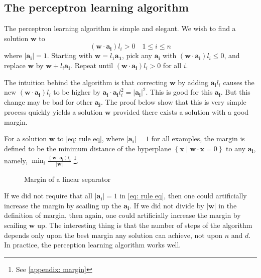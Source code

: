 \subsection{The perceptron learning algorithm}

The perceptron learning algorithm is simple and elegant. We wish to find a solution \(\mathbf{w} \) to 
\begin{equation} \label{eq: rule eq}
    \left( \mathbf{w}  \cdot \mathbf{a_i}  \right) l_i > 0 \quad 1 \leq i \leq n 
\end{equation}
where \(\vert \mathbf{a_i}  \vert = 1 \). Starting with \(\mathbf{w} = l_1 \mathbf{a_1} \), pick any \(\mathbf{a_i} \) with \(\left( \mathbf{w} \cdot \mathbf{a_i} \right) l_i \le 0 \), and replace \(\mathbf{w} \) by \(\mathbf{w} + l_i \mathbf{a_i} \). Repeat until \((\mathbf{w} \cdot \mathbf{a_i} ) l_i > 0\) for all \(i\). 

The intuition behind the algorithm is that correcting \(\mathbf{w} \) by adding \(\mathbf{a_i} l_i\) causes the new \(\left( \mathbf{w} \cdot \mathbf{a_i}  \right) l_i \) to be higher by \(\mathbf{a_i} \cdot \mathbf{a_i} l_i^2 = \vert \mathbf{a_i}  \vert^2  \). This is good for this \(\mathbf{a_i} \). But this change may be bad for other \(\mathbf{a_j} \). The proof below show that this is very simple process quickly yields a solution \(\mathbf{w} \) provided there exists a solution with a good margin. 

\begin{definition}[margin]
    For a solution \(\mathbf{w} \) to \autoref{eq: rule eq}, where \(\vert \mathbf{a_i}  \vert = 1 \) for all examples, the margin is defined to be the minimum distance of the hyperplane \(\left\{ \mathbf{x} \mid \mathbf{w} \cdot \mathbf{x} = 0 \right\} \) to any  \(\mathbf{a_i} \), namely, \(\min _i \frac{(\mathbf{w} \cdot \mathbf{a_i} ) l_i}{\vert \mathbf{w}  \vert }\) \footnote{See \autoref{appendix: margin}}.  
\end{definition}

\begin{figure}[H]
    \centering
    \caption{Margin of a linear separator}
    \label{fig:margin}
\end{figure}

If we did not require that all \(\vert \mathbf{a_i}  \vert = 1\) in \autoref{eq: rule eq}, then one could artificially increase the margin by scailing up the \(\mathbf{a_i} \). If we did not divide by \(\vert \mathbf{w}  \vert \) in the definition of margin, then again, one could artificially increase the margin by scailing \(\mathbf{w} \) up. The interesting thing is that the number of steps of the algorithm depends only upon the best margin any solution can achieve, not upon \(n\) and \(d\). In practice, the perception learning algorithm works well.   

